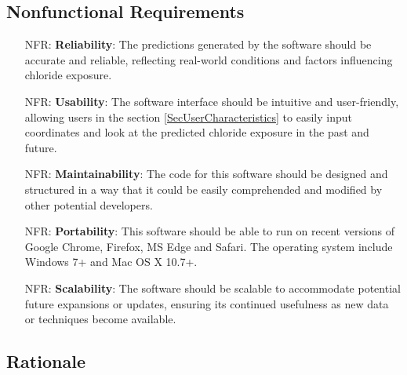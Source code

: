 \documentclass[12pt]{article}
\newcounter{nfrnum} %
\begin{document}
\subsection{Nonfunctional Requirements}

\noindent \begin{itemize}

\item[NFR\refstepcounter{nfrnum}\thenfrnum \label{NFR_Reliability}:]   \textbf{Reliability}: The predictions generated by the software should be accurate and reliable, reflecting real-world conditions and factors influencing chloride exposure.

\item[NFR\refstepcounter{nfrnum}\thenfrnum \label{NFR_Usability}:] \textbf{Usability}: The software interface should be intuitive and user-friendly, allowing users in the section \ref{SecUserCharacteristics} to easily input coordinates and look at the predicted chloride exposure in the past and future.

\item[NFR\refstepcounter{nfrnum}\thenfrnum \label{NFR_Maintainability}:] \textbf{Maintainability}: The code for this software should be designed and structured in a way that it could be easily comprehended and modified by other potential developers.

\item[NFR\refstepcounter{nfrnum}\thenfrnum \label{NFR_Portability}:]  \textbf{Portability}: This software should be able to run on recent versions of Google Chrome, Firefox, MS Edge and Safari. The operating system include Windows 7+ and Mac OS X 10.7+.


\item[NFR\refstepcounter{nfrnum}\thenfrnum \label{NFR_Scalability}:]   \textbf{Scalability}: The software should be scalable to accommodate potential future expansions or updates, ensuring its continued usefulness as new data or techniques become available.

\end{itemize}

\subsection{Rationale}
\end{document}
